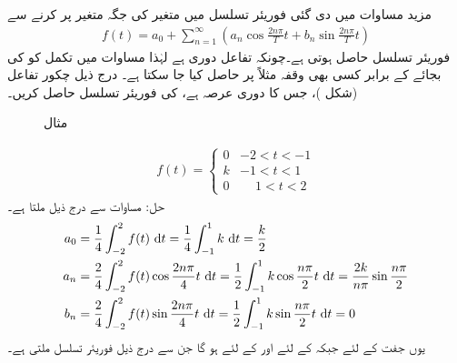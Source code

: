 مزید مساوات  میں دی گئی فوریئر تسلسل میں  متغیر کی جگہ  متغیر پر کرنے سے 
\begin{align}\label{مساوات_فوریئر_عمومی}
f(t)=a_0+\sum_{n=1}^{\infty} (a_n\cos \frac{2n\pi}{T}t+b_n\sin\frac{2n\pi}{T}t)
\end{align}
فوریئر تسلسل حاصل ہوتی ہے۔چونکہ تفاعل  دوری ہے لہٰذا مساوات  میں تکمل کو  کی بجائے  کے برابر کسی بھی وقفہ مثلاً   پر حاصل کیا جا سکتا ہے۔
\quad درج ذیل چکور تفاعل (شکل )، جس کا دوری عرصہ  ہے، کی فوریئر تسلسل حاصل کریں۔
\begin{figure}
\centering
{}
\caption{مثال }
\label{شکل_مثال_فوریئر_عمومی_چکور}
\end{figure}
%
\begin{align*}
f(t)=
\begin{cases}
0& -2<t<-1\\
k&-1<t<1\\
0&\phantom{-}1<t<2
\end{cases}
\end{align*}
حل: مساوات  سے درج ذیل ملتا ہے۔
\begin{align*}
a_0&=\frac{1}{4}\int_{-2}^{2} f(t)\,\dif t=\frac{1}{4}\int_{-1}^{1}k\,\dif t=\frac{k}{2}\\
a_n&=\frac{2}{4}\int_{-2}^{2}f(t)\cos\frac{2n\pi}{4}t\, \dif t=\frac{1}{2}\int_{-1}^{1} k \cos \frac{n\pi}{2}t\,\dif t=\frac{2k}{n\pi}\sin \frac{n\pi}{2}\\
b_n&=\frac{2}{4}\int_{-2}^{2}f(t)\sin\frac{2n\pi}{4}t\,\dif t=\frac{1}{2}\int_{-1}^{1} k \sin \frac{n\pi}{2}t\,\dif t=0
\end{align*}
یوں جفت  کے لئے  جبکہ  کے لئے  اور  کے لئے  ہو گا جن سے درج ذیل فوریئر تسلسل ملتی ہے۔
